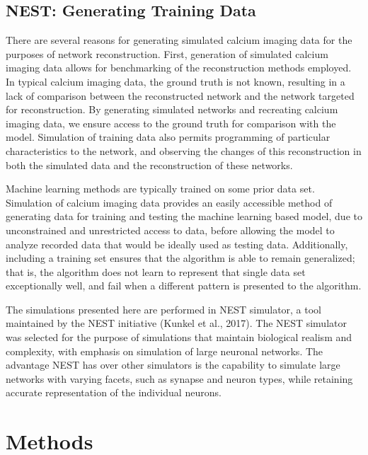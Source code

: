 \documentclass[11pt,titlepage]{article}
\begin{document}
\subsection{NEST: Generating Training Data}
There are several reasons for generating simulated calcium imaging data for the purposes of network reconstruction. First, generation of simulated calcium imaging data allows for benchmarking of the reconstruction methods employed. In typical calcium imaging data, the ground truth is not known, resulting in a lack of comparison between the reconstructed network and the network targeted for reconstruction. By generating simulated networks and recreating calcium imaging data, we ensure access to the ground truth for comparison with the model. Simulation of training data also permits programming of particular characteristics to the network, and observing the changes of this reconstruction in both the simulated data and the reconstruction of these networks.\par
Machine learning methods are typically trained on some prior data set. Simulation of calcium imaging data provides an easily accessible method of generating data for training and testing the machine learning based model, due to unconstrained and unrestricted access to data, before allowing the model to analyze recorded data that would be ideally used as testing data. Additionally, including a training set ensures that the algorithm is able to remain generalized; that is, the algorithm does not learn to represent that single data set exceptionally well, and fail when a different pattern is presented to the algorithm.\par
The simulations presented here are performed in NEST simulator, a tool maintained by the NEST initiative (Kunkel et al., 2017). The NEST simulator was selected for the purpose of simulations that maintain biological realism and complexity, with emphasis on simulation of large neuronal networks. The advantage NEST has over other simulators is the capability to simulate large networks with varying facets, such as synapse and neuron types, while retaining accurate representation of the individual neurons.\par
\newpage
\section{Methods}
\end{document}
